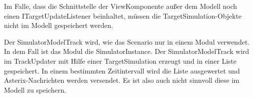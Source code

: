 Im Falle, dass die Schnittstelle der ViewKomponente außer dem Modell noch einen ITargetUpdateListener beinhaltet, müssen die TargetSimulation-Objekte nicht im Modell gespeichert werden.

Der SimulatorModelTrack wird, wie das Scenario nur in einem Modul verwendet. In dem Fall ist das Modul die SimulatorInstance. Der SimulatorModelTrack wird im TrackUpdater mit Hilfe einer TargetSimulation erzeugt und in einer Liste gespeichert. In einem bestimmten Zeitintervall wird die Liste ausgewertet und Asterix-Nachrichten werden versendet. Es ist also auch nicht sinnvoll diese im Modell zu speichern.

